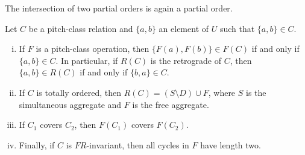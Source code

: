 \begin{theorem}
    \cite[194]{Starr1984}
    The intersection of two partial orders is again a partial order.
\end{theorem}

\begin{theorem}
    \cite[195]{Starr1984}
    \label{starr-theorem-operations}
    Let $C$ be a pitch-class relation and $\{ a, b \}$ an element of $U$ such that $\{ a, b \} \in C$.
    \begin{enumerate}[i.]
        \item If $F$ is a pitch-class operation, then $\{ F(a), F(b) \} \in F(C)$ if and only if $\{ a, b \} \in C$. In particular, if $R(C)$ is the retrograde of $C$, then $\{ a, b \} \in R(C)$ if and only if $\{ b, a \} \in C$.
        \item If $C$ is totally ordered, then $R(C) = (S \setminus D) \cup F$, where $S$ is the simultaneous aggregate and $F$ is the free aggregate.
        \item If $C_1$ covers $C_2$, then $F(C_1)$ covers $F(C_2)$.
        \item Finally, if $C$ is $FR$-invariant, then all cycles in $F$ have length two.
    \end{enumerate}
\end{theorem}

